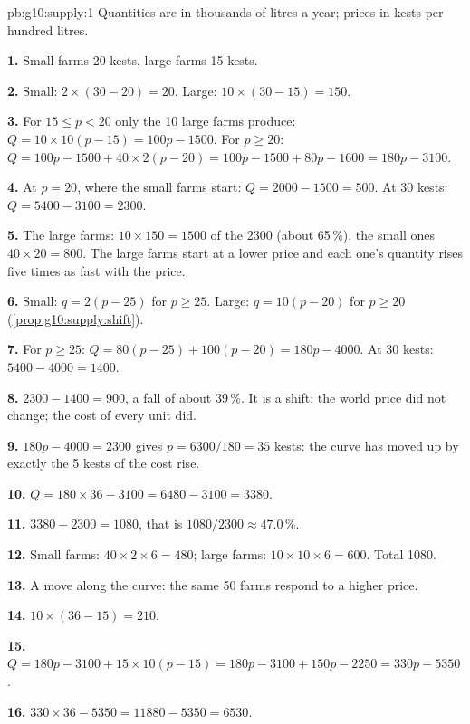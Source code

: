 \begin{solution}{pb:g10:supply:1}
Quantities are in thousands of litres a year; prices in kests per hundred litres.

\textbf{1.} Small farms 20 kests, large farms 15 kests.

\textbf{2.} Small: $2 \times (30 - 20) = 20$. Large: $10 \times (30 - 15) = 150$.

\textbf{3.} For $15 \le p < 20$ only the 10 large farms produce: $Q = 10 \times 10(p - 15) = 100p - 1500$. For $p \ge 20$: $Q = 100p - 1500 + 40 \times
2(p - 20) = 100p - 1500 + 80p - 1600 = 180p - 3100$.

\textbf{4.} At $p = 20$, where the small farms start: $Q = 2000 - 1500 = 500$. At 30 kests: $Q = 5400 - 3100 = 2300$.

\textbf{5.} The large farms: $10 \times 150 = 1500$ of the 2300 (about 65\,\%), the small ones $40 \times 20 = 800$. The large farms start at a lower
price and each one's quantity rises five times as fast with the price.

\textbf{6.} Small: $q = 2(p - 25)$ for $p \ge 25$. Large: $q = 10(p - 20)$ for $p \ge 20$ (\cref{prop:g10:supply:shift}).

\textbf{7.} For $p \ge 25$: $Q = 80(p - 25) + 100(p - 20) = 180p - 4000$. At 30 kests: $5400 - 4000 = 1400$.

\textbf{8.} $2300 - 1400 = 900$, a fall of about 39\,\%. It is a shift: the world price did not change; the cost of every unit did.

\textbf{9.} $180p - 4000 = 2300$ gives $p = 6300/180 = 35$ kests: the curve has moved up by exactly the 5 kests of the cost rise.

\textbf{10.} $Q = 180 \times 36 - 3100 = 6480 - 3100 = 3380$.

\textbf{11.} $3380 - 2300 = 1080$, that is $1080/2300 \approx 47.0\,\%$.

\textbf{12.} Small farms: $40 \times 2 \times 6 = 480$; large farms: $10 \times 10 \times 6 = 600$. Total 1080.

\textbf{13.} A move along the  curve: the same 50 farms respond to a higher price.

\textbf{14.} $10 \times (36 - 15) = 210$.

\textbf{15.} $Q = 180p - 3100 + 15 \times 10(p - 15) = 180p - 3100 + 150p - 2250 = 330p - 5350$.

\textbf{16.} $330 \times 36 - 5350 = 11880 - 5350 = 6530$.


\end{solution}
